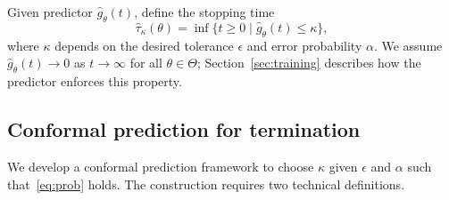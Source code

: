 \documentclass[12pt]{article}
\theoremstyle{definition}
\theoremstyle{remark}
\newcommand{\paramspace}{\Theta}
\newcommand{\param}{\theta}
\newcommand{\predgap}{\hat{g}}
\newcommand{\tol}{\epsilon}
\newcommand{\errorprob}{\alpha}
\newcommand{\pst}{\hat{\tau}}
\newcommand{\lt}{\kappa}
\newcommand{\paramspace}{\Theta}
\newcommand{\param}{\theta}
\newcommand{\predgap}{\hat{g}}
\newcommand{\tol}{\epsilon}
\newcommand{\errorprob}{\alpha}
\newcommand{\pst}{\hat{\tau}}
\newcommand{\lt}{\kappa}
\theoremstyle{plain}
\theoremstyle{definition}
\theoremstyle{remark}
\begin{document}
Given predictor $\predgap_\param(t)$, define the stopping time
\begin{equation*}
    \pst_\lt(\param) = \inf \{t \ge 0 \mid \predgap_\param(t) \le \lt\},
\end{equation*}
where $\lt$ depends on the desired tolerance $\tol$ and error probability $\errorprob$.
We assume $\predgap_\param(t) \to 0$ as $t \to \infty$ for all $\param \in \paramspace$; Section~\ref{sec:training} describes how the predictor enforces this property.
\subsection{Conformal prediction for termination} \label{sec:conformal}
We develop a conformal prediction framework to choose $\lt$ given $\tol$ and $\errorprob$ such that~\eqref{eq:prob} holds.
The construction requires two technical definitions.
\end{document}
